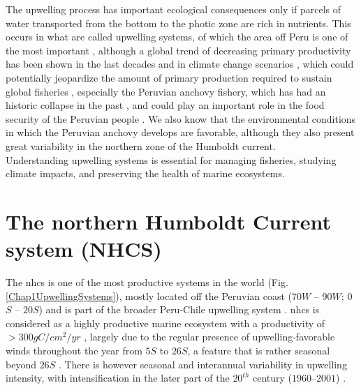 The upwelling process has important ecological consequences only if parcels of water transported from the bottom to the photic zone are rich in nutrients. This occurs in what are called upwelling systems, of which the area off Peru is one of the most important \citep{ChavBert2008}, although  a global trend of decreasing primary productivity has been shown in the last decades \citep{Dema2009,Roxy2016} and in climate change scenarios \citep{Blanc2012,Kulk2020}, which could potentially jeopardize the amount of primary production required to sustain global fisheries \citep{PaulChri1995}, especially the Peruvian anchovy fishery, which has had an historic collapse in the past \citep{AriaNiqu2011,Aria2012}, and could play an important role in the food security of the Peruvian people \citep{MajlDela2017}. We also know that the environmental conditions in which the Peruvian anchovy develops are favorable, although they also present great variability in the northern zone of the Humboldt current.\\

Understanding upwelling systems is essential for managing fisheries, studying climate impacts, and preserving the health of marine ecosystems.\\

\clearpage
\section{The northern Humboldt Current system (NHCS)}\label{Chap1NHCS}

The \acrfull{nhcs} is one of the most productive systems in the world (Fig. \ref{Chap1UpwellingSystems}), mostly located off the Peruvian coast ($70$\textdegree $W$ – $90$\textdegree $W$; $0$\textdegree $S$ – $20$\textdegree $S$) and is part of the broader Peru-Chile upwelling system \citep{GradChai2018}. \acrshort{nhcs} is considered as a highly productive marine ecosystem with a productivity of $>300gC/cm^{2}/yr$ \citep{KampCap5}, largely due to the regular presence of upwelling-favorable winds throughout the year from $5$\textdegree $S$ to $26$\textdegree $S$, a feature that is rather seasonal beyond $26$\textdegree $S$ \citep{Belm2014}. There is however seasonal and interannual variability in upwelling intensity, with intensification in the later part of the $20^{th}$ century ($1960 – 2001$) \citep{Nara2010}.\\


